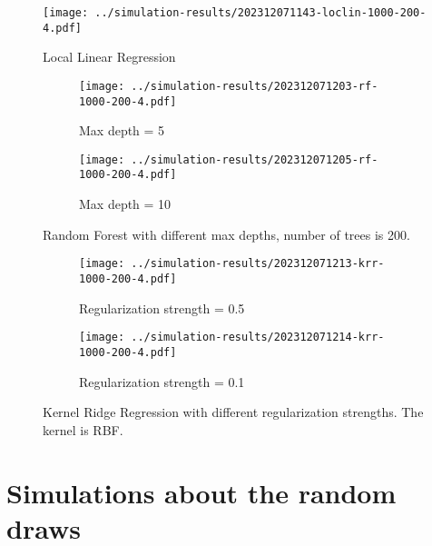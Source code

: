 \documentclass[12pt]{article}
\begin{document}
\begin{figure}[htbp]
    \centering
    \texttt{[image: ../simulation-results/202312071143-loclin-1000-200-4.pdf]}
    \caption{Local Linear Regression}
    \label{fig:loclin}
\end{figure}
\begin{figure}[ht]
    \centering
    \begin{subfigure}[b]{0.45\textwidth}
        \texttt{[image: ../simulation-results/202312071203-rf-1000-200-4.pdf]}
        \caption{Max depth = 5}
        \label{fig:1}
    \end{subfigure}
    \hfill
    \begin{subfigure}[b]{0.45\textwidth}
        \texttt{[image: ../simulation-results/202312071205-rf-1000-200-4.pdf]}
        \caption{Max depth = 10}
        \label{fig:2}
    \end{subfigure}
    \caption{Random Forest with different max depths, number of trees is 200.}
    \label{fig:comparison1}
\end{figure}


\begin{figure}[ht]
    \centering
    \begin{subfigure}[b]{0.45\textwidth}
        \texttt{[image: ../simulation-results/202312071213-krr-1000-200-4.pdf]}
        \caption{Regularization strength = 0.5}
        \label{fig:krr-1}
    \end{subfigure}
    \hfill
    \begin{subfigure}[b]{0.45\textwidth}
        \texttt{[image: ../simulation-results/202312071214-krr-1000-200-4.pdf]}
        \caption{Regularization strength = 0.1}
        \label{fig:krr-2}
    \end{subfigure}
    \caption{Kernel Ridge Regression with different regularization strengths. The kernel is RBF.}
    \label{fig:comparison2}
\end{figure}


\newpage

\section{Simulations about the random draws }
\end{document}
